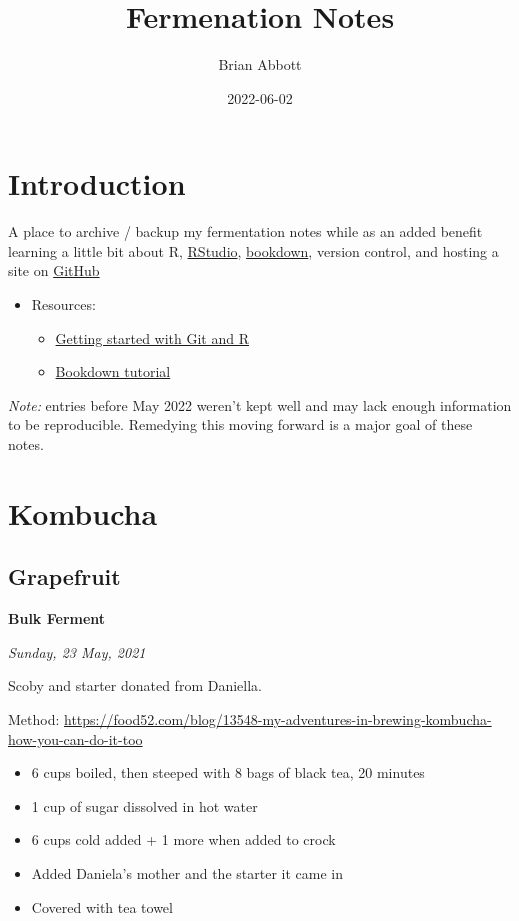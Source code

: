\documentclass[
]{book}
\title{Fermenation Notes}
\author{Brian Abbott}
\date{2022-06-02}
\providecommand{\tightlist}{%
  \setlength{\itemsep}{0pt}\setlength{\parskip}{0pt}}
\begin{document}
\maketitle

{
\setcounter{tocdepth}{1}
\tableofcontents
}
\hypertarget{introduction}{%
\chapter{Introduction}\label{introduction}}

A place to archive / backup my fermentation notes while as an added benefit learning a little bit about R, \href{https://www.rstudio.com/}{RStudio}, \href{https://bookdown.org/}{bookdown}, version control, and hosting a site on \href{https://github.com/}{GitHub}

\begin{itemize}
\tightlist
\item
  Resources:

  \begin{itemize}
  \tightlist
  \item
    \href{https://happygitwithr.com/}{Getting started with Git and R}
  \item
    \href{https://bookdown.org/yihui/bookdown/get-started.html}{Bookdown tutorial}
  \end{itemize}
\end{itemize}

\emph{Note:} entries before May 2022 weren't kept well and may lack enough information to be reproducible. Remedying this moving forward is a major goal of these notes.

\hypertarget{kombucha}{%
\chapter{Kombucha}\label{kombucha}}

\hypertarget{grapefruit}{%
\section{Grapefruit}\label{grapefruit}}

\textbf{Bulk Ferment}

\emph{Sunday, 23 May, 2021}

Scoby and starter donated from Daniella.

Method: \url{https://food52.com/blog/13548-my-adventures-in-brewing-kombucha-how-you-can-do-it-too}

\begin{itemize}
\item
  6 cups boiled, then steeped with 8 bags of black tea, 20 minutes
\item
  1 cup of sugar dissolved in hot water
\item
  6 cups cold added + 1 more when added to crock
\item
  Added Daniela's mother and the starter it came in
\item
  Covered with tea towel
\end{itemize}
\end{document}
